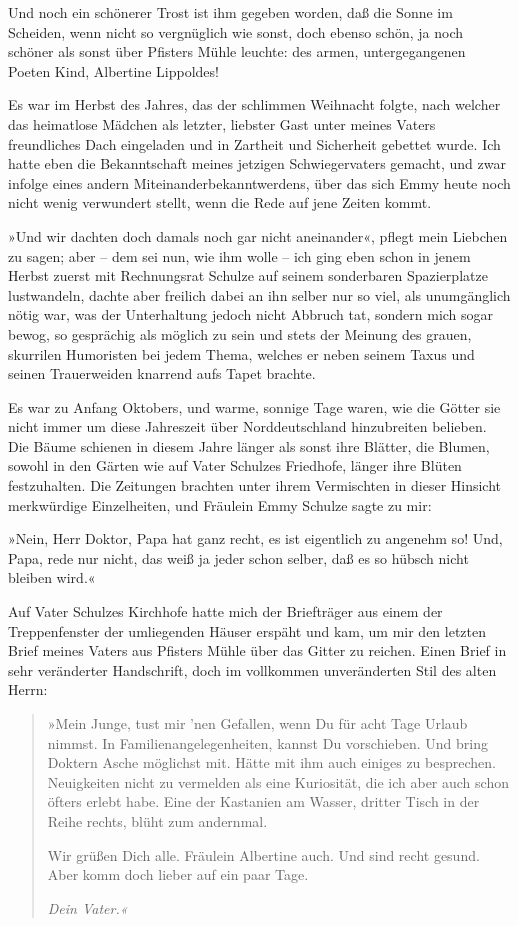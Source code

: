 Und noch ein schönerer Trost ist ihm gegeben worden, daß die Sonne
im Scheiden, wenn nicht so vergnüglich wie sonst, doch ebenso
schön, ja noch schöner als sonst über Pfisters Mühle leuchte: des
armen, untergegangenen Poeten Kind, Albertine Lippoldes!

Es war im Herbst des Jahres, das der schlimmen Weihnacht folgte,
nach welcher das heimatlose Mädchen als letzter, liebster Gast
unter meines Vaters freundliches Dach eingeladen und in Zartheit
und Sicherheit gebettet wurde. Ich hatte eben die Bekanntschaft
meines jetzigen Schwiegervaters gemacht, und zwar infolge eines
andern Miteinanderbekanntwerdens, über das sich Emmy heute noch
nicht wenig verwundert stellt, wenn die Rede auf jene Zeiten
kommt.

»Und wir dachten doch damals noch gar nicht aneinander«, pflegt
mein Liebchen zu sagen; aber – dem sei nun, wie ihm wolle – ich
ging eben schon in jenem Herbst zuerst mit Rechnungsrat Schulze auf
seinem sonderbaren Spazierplatze lustwandeln, dachte aber freilich
dabei an ihn selber nur so viel, als unumgänglich nötig war, was
der Unterhaltung jedoch nicht Abbruch tat, sondern mich sogar
bewog, so gesprächig als möglich zu sein und stets der Meinung des
grauen, skurrilen Humoristen bei jedem Thema, welches er neben
seinem Taxus und seinen Trauerweiden knarrend aufs Tapet brachte.

Es war zu Anfang Oktobers, und warme, sonnige Tage waren, wie die
Götter sie nicht immer um diese Jahreszeit über Norddeutschland
hinzubreiten belieben. Die Bäume schienen in diesem Jahre länger
als sonst ihre Blätter, die Blumen, sowohl in den Gärten wie auf
Vater Schulzes Friedhofe, länger ihre Blüten festzuhalten. Die
Zeitungen brachten unter ihrem Vermischten in dieser Hinsicht
merkwürdige Einzelheiten, und Fräulein Emmy Schulze sagte zu mir:

»Nein, Herr Doktor, Papa hat ganz recht, es ist eigentlich zu
angenehm so! Und, Papa, rede nur nicht, das weiß ja jeder schon
selber, daß es so hübsch nicht bleiben wird.«

Auf Vater Schulzes Kirchhofe hatte mich der Briefträger aus einem
der Treppenfenster der umliegenden Häuser erspäht und kam, um mir
den letzten Brief meines Vaters aus Pfisters Mühle über das Gitter
zu reichen. Einen Brief in sehr veränderter Handschrift, doch im
vollkommen unveränderten Stil des alten Herrn:

\begin{quotation}
»Mein Junge, tust mir 'nen Gefallen, wenn Du für acht Tage Urlaub
nimmst. In Familienangelegenheiten, kannst Du vorschieben. Und
bring Doktern Asche möglichst mit. Hätte mit ihm auch einiges zu
besprechen. Neuigkeiten nicht zu vermelden als eine Kuriosität, die
ich aber auch schon öfters erlebt habe. Eine der Kastanien am
Wasser, dritter Tisch in der Reihe rechts, blüht zum andernmal.

Wir grüßen Dich alle. Fräulein Albertine auch. Und sind recht
gesund. Aber komm doch lieber auf ein paar Tage.

\textit{Dein Vater.«}
\end{quotation}

